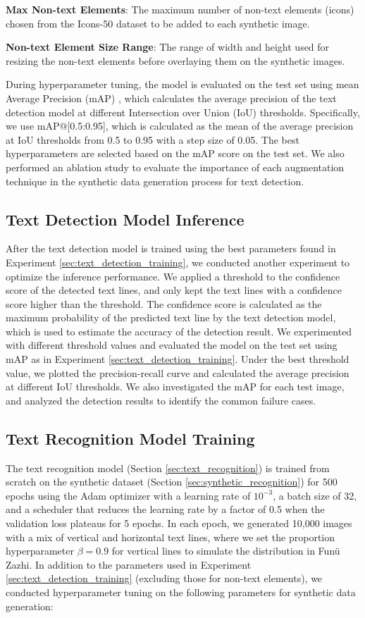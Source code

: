 \documentclass[12pt,twoside]{report}
\begin{document}
\textbf{Max Non-text Elements}: The maximum number of non-text elements (icons) chosen from the Icons-50 dataset \cite{icons50} to be added to each synthetic image.

\textbf{Non-text Element Size Range}: The range of width and height used for resizing the non-text elements before overlaying them on the synthetic images.

During hyperparameter tuning, the model is evaluated on the test set using mean Average Precision (mAP) \cite{map}, which calculates the average precision of the text detection model at different Intersection over Union (IoU) thresholds. Specifically, we use mAP@[0.5:0.95], which is calculated as the mean of the average precision at IoU thresholds from 0.5 to 0.95 with a step size of 0.05. The best hyperparameters are selected based on the mAP score on the test set. We also performed an ablation study to evaluate the importance of each augmentation technique in the synthetic data generation process for text detection.

\subsection{Text Detection Model Inference}
\label{sec:text_detection_inference}
After the text detection model is trained using the best parameters found in Experiment \ref{sec:text_detection_training}, we conducted another experiment to optimize the inference performance. We applied a threshold to the confidence score of the detected text lines, and only kept the text lines with a confidence score higher than the threshold. The confidence score is calculated as the maximum probability of the predicted text line by the text detection model, which is used to estimate the accuracy of the detection result. We experimented with different threshold values and evaluated the model on the test set using mAP as in Experiment \ref{sec:text_detection_training}. Under the best threshold value, we plotted the precision-recall curve and calculated the average precision at different IoU thresholds. We also investigated the mAP for each test image, and analyzed the detection results to identify the common failure cases.

\subsection{Text Recognition Model Training}
\label{sec:text_recognition_training}
The text recognition model (Section \ref{sec:text_recognition}) is trained from scratch on the synthetic dataset (Section \ref{sec:synthetic_recognition}) for 500 epochs using the Adam optimizer \cite{adamoptimizer} with a learning rate of $10^{-3}$, a batch size of 32, and a scheduler that reduces the learning rate by a factor of 0.5 when the validation loss plateaus for 5 epochs. In each epoch, we generated 10,000 images with a mix of vertical and horizontal text lines, where we set the proportion hyperparameter $\beta=0.9$ for vertical lines to simulate the distribution in Funü Zazhi. In addition to the parameters used in Experiment \ref{sec:text_detection_training} (excluding those for non-text elements), we conducted hyperparameter tuning on the following parameters for synthetic data generation:
\end{document}
